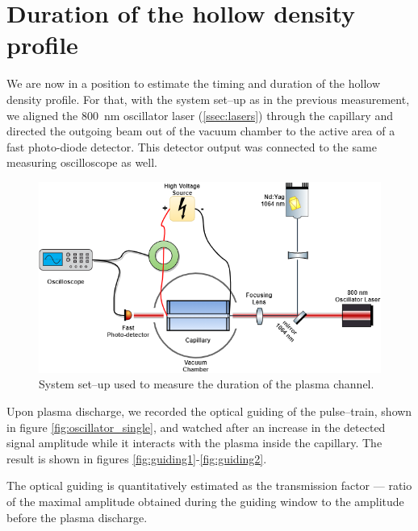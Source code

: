 \documentclass[../main.tex]{subfiles}
\begin{document}
\section{Duration of the hollow density profile}\label{sec:duration-of-guiding}
We are now in a position to estimate the timing and duration of the hollow density profile. For that, with the system set--up as in the previous measurement, we aligned the \SI{800}{\nm} oscillator laser (\ref{ssec:lasers}) through the capillary and directed the outgoing beam out of the vacuum chamber to the active area of a fast photo-diode detector. This detector output was connected to the same measuring oscilloscope as well.

\begin{figure}
\centering \includegraphics[width=\textwidth]{figures/oscillator.png}
\caption{System set--up used to measure the duration of the plasma channel.}
\label{fig:oscillator}
\end{figure}
Upon plasma discharge, we recorded the optical guiding of the pulse--train, shown in figure \ref{fig:oscillator_single}, and watched after an increase in the detected signal amplitude while it interacts with the plasma inside the capillary. The result is shown in figures \ref{fig:guiding1}-\ref{fig:guiding2}.

The optical guiding is quantitatively estimated as the transmission factor --- ratio of the maximal amplitude obtained during the guiding window to the amplitude before the plasma discharge.
\end{document}
